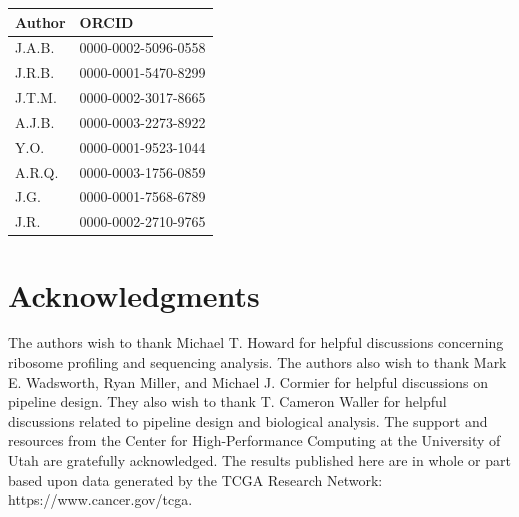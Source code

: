 \documentclass[10pt, oneside]{article}
\newcommand{\beginsupplement}{%
  \setcounter{table}{0}
  \renewcommand{\thetable}{S\arabic{table}}%
  \setcounter{figure}{0}
  \renewcommand{\thefigure}{S\arabic{figure}}%
}
\begin{document}
\begin{table}[!]
    \centering
{}
\begin{tabular}{p{1.5cm}p{4cm}}
 \textbf{Author} & \textbf{ORCID}\\
 \hline
 J.A.B. & 0000-0002-5096-0558 \\
 \hline
 J.R.B. & 0000-0001-5470-8299 \\
 \hline
 J.T.M. & 0000-0002-3017-8665 \\
 \hline
 A.J.B. & 0000-0003-2273-8922 \\
 \hline
 Y.O. & 0000-0001-9523-1044 \\
 \hline
 A.R.Q. & 0000-0003-1756-0859 \\
 \hline
 J.G. & 0000-0001-7568-6789 \\
 \hline
 J.R. & 0000-0002-2710-9765 \\
\end{tabular}
\end{table}

\section*{Acknowledgments}
The authors wish to thank Michael T. Howard for helpful discussions concerning ribosome profiling and sequencing analysis. The authors also wish to thank Mark E. Wadsworth, Ryan Miller, and Michael J. Cormier for helpful discussions on pipeline design. They also wish to thank T. Cameron Waller for helpful discussions related to pipeline design and biological analysis. The support and resources from the Center for High-Performance Computing at the University of Utah are gratefully acknowledged. The results published here are in whole or part based upon data generated by the TCGA Research Network: https://www.cancer.gov/tcga.




\beginsupplement
\end{document}
